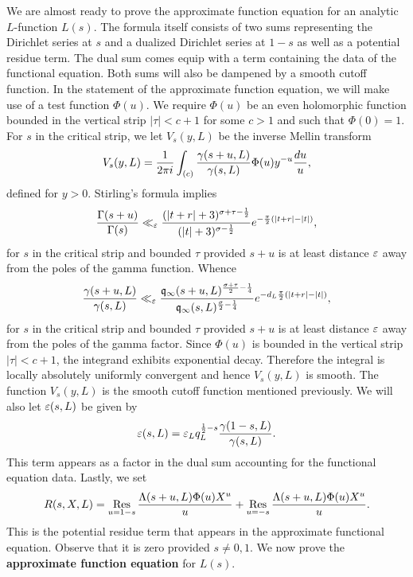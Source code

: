     We are almost ready to prove the approximate function equation for an analytic \(L\)-function \(L(s)\). The formula itself consists of two sums representing the Dirichlet series at \(s\) and a dualized Dirichlet series at \(1-s\) as well as a potential residue term. The dual sum comes equip with a term containing the data of the functional equation. Both sums will also be dampened by a smooth cutoff function. In the statement of the approximate function equation, we will make use of a test function \(\Phi(u)\). We require \(\Phi(u)\) be an even holomorphic function bounded in the vertical strip \(|\tau| < c+1\) for some \(c > 1\) and such that \(\Phi(0) = 1\). For \(s\) in the critical strip, we let \(V_{s}(y,L)\) be the inverse Mellin transform
    \[
      V_{s}(y,L) = \frac{1}{2\pi i}\int_{(c)}\frac{\gamma(s+u,L)}{\gamma(s,L)}\Phi(u)y^{-u}\frac{du}{u},
    \]
    defined for \(y > 0\). Stirling's formula implies
    \[
      \frac{\Gamma(s+u)}{\Gamma(s)} \ll_{\varepsilon} \frac{(|t+r|+3)^{\sigma+\tau-\frac{1}{2}}}{(|t|+3)^{\sigma-\frac{1}{2}}}e^{-\frac{\pi}{2}(|t+r|-|t|)},
    \]
    for \(s\) in the critical strip and bounded \(\tau\) provided \(s+u\) is at least distance \(\varepsilon\) away from the poles of the gamma function. Whence
    \begin{equation}\label{equ:gamma_factor_s_and_u_estimate}
      \frac{\gamma(s+u,L)}{\gamma(s,L)} \ll_{\varepsilon} \frac{\mathfrak{q}_{\infty}(s+u,L)^{\frac{\sigma+\tau}{2}-\frac{1}{4}}}{\mathfrak{q}_{\infty}(s,L)^{\frac{\sigma}{2}-\frac{1}{4}}}e^{-d_{L}\frac{\pi}{2}(|t+r|-|t|)},
    \end{equation}
    for \(s\) in the critical strip and bounded \(\tau\) provided \(s+u\) is at least distance \(\varepsilon\) away from the poles of the gamma factor. Since \(\Phi(u)\) is bounded in the vertical strip \(|\tau| < c+1\), the integrand exhibits exponential decay. Therefore the integral is locally absolutely uniformly convergent and hence \(V_{s}(y,L)\) is smooth. The function \(V_{s}(y,L)\) is the smooth cutoff function mentioned previously. We will also let \(\varepsilon(s,L)\) be given by
    \[
      \varepsilon(s,L) = \varepsilon_{L}q_{L}^{\frac{1}{2}-s}\frac{\gamma(1-s,L)}{\gamma(s,L)}.
    \]
    This term appears as a factor in the dual sum accounting for the functional equation data. Lastly, we set
    \[
      R(s,X,L) = \operatorname*{\mathrm{Res}}_{u = 1-s}\frac{\Lambda(s+u,L)\Phi(u)X^{u}}{u}+\operatorname*{\mathrm{Res}}_{u = -s}\frac{\Lambda(s+u,L)\Phi(u)X^{u}}{u}.
    \]
    This is the potential residue term that appears in the approximate functional equation. Observe that it is zero provided \(s \neq 0,1\). We now prove the \textbf{approximate function equation} for \(L(s)\).

